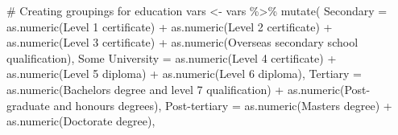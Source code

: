 \documentclass[
  letterpaper,
  DIV=11,
  numbers=noendperiod,
  oneside]{scrartcl}
\newenvironment{Shaded}{\begin{snugshade}}{\end{snugshade}}
\newcommand{\AttributeTok}[1]{\textcolor[rgb]{0.40,0.45,0.13}{#1}}
\newcommand{\CommentTok}[1]{\textcolor[rgb]{0.37,0.37,0.37}{#1}}
\newcommand{\FunctionTok}[1]{\textcolor[rgb]{0.28,0.35,0.67}{#1}}
\newcommand{\NormalTok}[1]{\textcolor[rgb]{0.00,0.23,0.31}{#1}}
\newcommand{\OtherTok}[1]{\textcolor[rgb]{0.00,0.23,0.31}{#1}}
\newcommand{\SpecialCharTok}[1]{\textcolor[rgb]{0.37,0.37,0.37}{#1}}
\newcommand{\StringTok}[1]{\textcolor[rgb]{0.13,0.47,0.30}{#1}}
\begin{document}
\begin{Shaded}
\begin{Highlighting}[]
\CommentTok{\# Creating groupings for education}
\NormalTok{vars }\OtherTok{\textless{}{-}}\NormalTok{ vars }\SpecialCharTok{\%\textgreater{}\%}
  \FunctionTok{mutate}\NormalTok{(}
    \AttributeTok{Secondary =} \FunctionTok{as.numeric}\NormalTok{(}\StringTok{\textasciigrave{}}\AttributeTok{Level 1 certificate}\StringTok{\textasciigrave{}}\NormalTok{) }\SpecialCharTok{+} \FunctionTok{as.numeric}\NormalTok{(}\StringTok{\textasciigrave{}}\AttributeTok{Level 2 certificate}\StringTok{\textasciigrave{}}\NormalTok{) }\SpecialCharTok{+} \FunctionTok{as.numeric}\NormalTok{(}\StringTok{\textasciigrave{}}\AttributeTok{Level 3 certificate}\StringTok{\textasciigrave{}}\NormalTok{) }\SpecialCharTok{+} \FunctionTok{as.numeric}\NormalTok{(}\StringTok{\textasciigrave{}}\AttributeTok{Overseas secondary school qualification}\StringTok{\textasciigrave{}}\NormalTok{),}
    \StringTok{\textasciigrave{}}\AttributeTok{Some University}\StringTok{\textasciigrave{}} \OtherTok{=} \FunctionTok{as.numeric}\NormalTok{(}\StringTok{\textasciigrave{}}\AttributeTok{Level 4 certificate}\StringTok{\textasciigrave{}}\NormalTok{) }\SpecialCharTok{+} \FunctionTok{as.numeric}\NormalTok{(}\StringTok{\textasciigrave{}}\AttributeTok{Level 5 diploma}\StringTok{\textasciigrave{}}\NormalTok{) }\SpecialCharTok{+} \FunctionTok{as.numeric}\NormalTok{(}\StringTok{\textasciigrave{}}\AttributeTok{Level 6 diploma}\StringTok{\textasciigrave{}}\NormalTok{),}
    \AttributeTok{Tertiary =} \FunctionTok{as.numeric}\NormalTok{(}\StringTok{\textasciigrave{}}\AttributeTok{Bachelor\textquotesingle{}s degree and level 7 qualification}\StringTok{\textasciigrave{}}\NormalTok{) }\SpecialCharTok{+} \FunctionTok{as.numeric}\NormalTok{(}\StringTok{\textasciigrave{}}\AttributeTok{Post{-}graduate and honours degrees}\StringTok{\textasciigrave{}}\NormalTok{),}
    \StringTok{\textasciigrave{}}\AttributeTok{Post{-}tertiary}\StringTok{\textasciigrave{}} \OtherTok{=} \FunctionTok{as.numeric}\NormalTok{(}\StringTok{\textasciigrave{}}\AttributeTok{Master\textquotesingle{}s degree}\StringTok{\textasciigrave{}}\NormalTok{) }\SpecialCharTok{+} \FunctionTok{as.numeric}\NormalTok{(}\StringTok{\textasciigrave{}}\AttributeTok{Doctorate degree}\StringTok{\textasciigrave{}}\NormalTok{),}

\end{Highlighting}
\end{Shaded}
\end{document}
